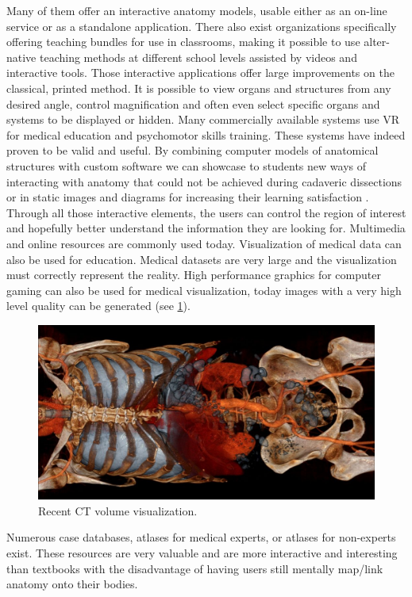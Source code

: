 Many of them offer an interactive anatomy models, usable either as an on-line service or as a standalone application. There also exist organizations specifically offering teaching bundles for use in classrooms, making it possible to use alter-native teaching methods at different school levels assisted by videos and interactive tools. Those interactive applications offer large improvements on the classical, printed method. It is possible to view organs and structures from any desired angle, control magnification and often even select specific organs and systems to be displayed or hidden. 
Many commercially available systems use VR for medical education and psychomotor skills training. These systems have indeed proven to be valid and useful.
By combining computer models of anatomical structures with custom software we can showcase to students new ways of interacting with anatomy that could not be achieved during cadaveric dissections or in static images and diagrams for increasing their learning satisfaction \cite{Bacca2014}. 
Through all those interactive elements, the users can control the region of interest and hopefully better understand the information they are looking for. 
Multimedia and online resources are commonly used today. 
Visualization of medical data can also be used for education. Medical datasets are very large and the visualization must correctly represent the reality. High performance graphics for computer gaming can also be used for medical visualization, today images with a very high level quality can be generated (see \figurename{\ref{fig:2-bg:CTRendering}}).  
\begin{figure}
\centering  %
\includegraphics[width=0.8\linewidth]{figures/2-bg/CTRendering}
\caption{Recent CT volume visualization.}
\label{fig:2-bg:CTRendering}
\end{figure}

Numerous case databases, atlases for medical experts, or atlases for non-experts exist. These resources are very valuable and are more interactive and interesting than textbooks with the disadvantage of having users still mentally map/link anatomy onto their bodies.

